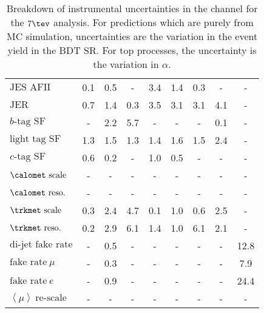 \begin{table}[p!]
\begin{center}
{\begin{tabular}{l || c c | c c c c c c }
$\textrm{JES AFII}$ & 0.1 & 0.5 & - & 3.4 & 1.4 & 0.3 & - & - \\
$\textrm{JER}$ & 0.7 & 1.4 & 0.3 & 3.5 & 3.1 & 3.1 & 4.1 & - \\
$b\textrm{-tag SF}$ & - & 2.2 & 5.7 & - & - & - & 0.1 & - \\
$\textrm{light tag SF}$ & 1.3 & 1.5 & 1.3 & 1.4 & 1.6 & 1.5 & 2.4 & -
\\
$c\textrm{-tag SF}$ & 0.6 & 0.2 & - & 1.0 & 0.5 & - & - & - \\
$\calomet~\textrm{scale}$ & - & - & - & - & - & - & - & - \\
$\calomet~\textrm{reso.}$ & - & - & - & - & - & - & - & - \\
$\trkmet~\textrm{scale}$ & 0.3 & 2.4 & 4.7 & 0.1 & 1.0 & 0.6 & 2.5 & -
\\
$\trkmet~\textrm{reso.}$ & 0.2 & 2.9 & 6.1 & 1.4 & 1.0 & 6.1 & 2.1 & -
\\
$\textrm{di-jet fake rate}$ & - & 0.5 & - & - & - & - & - & 12.8 \\
$\textrm{fake rate}~\mu$ & - & 0.3 & - & - & - & - & - & 7.9 \\
$\textrm{fake rate}~e$ & - & 0.9 & - & - & - & - & - & 24.4 \\
$\left \langle \mu \right \rangle~\textrm{re-scale}$ & - & - & - & - &
- & - & - & - \\
\hline
\end{tabular}
}
\caption[Instrumental uncertainty summary in the \emme
  channel for the $7 \tev$ analysis.]{Breakdown of instrumental
  uncertainties in the \emme
  channel for the $7 \tev$ analysis. For predictions which are purely from MC simulation,
  uncertainties are
  the variation in the event yield in the BDT SR. For top processes,
  the uncertainty is the variation in $\alpha$.}
\label{chap:analysis:tab:exp_sys_df}
\end{center}
\end{table}
